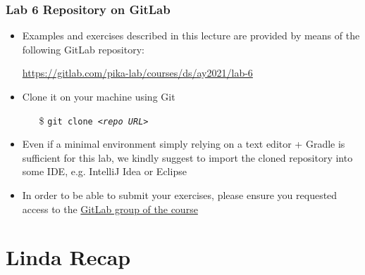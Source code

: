 \documentclass[presentation]{beamer}\mode<presentation>{\usetheme{AMSCesenaPurpleAndGold}}
\newcommand{\labN}{6}
\newcommand{\labGroup}{https://gitlab.com/pika-lab/courses/ds/ay2021}
\newcommand{\labRepo}{\labGroup/lab-\labN}
\begin{document}
\begin{frame}
	\frametitle{Lab \labN{} Repository on GitLab}

	\begin{itemize}
		\item Examples and exercises described in this lecture are provided by means of the following GitLab repository:
		\begin{center}
			\url{\labRepo}
		\end{center}

		\vfill

		\item Clone it on your machine using Git
		\begin{itemize}
		    \item[\$] \texttt{git clone \textit{<repo URL>}}
		\end{itemize}

		\vfill

		\item Even if a minimal environment simply relying on a text editor + Gradle is sufficient for this lab, we kindly suggest to import the cloned repository into some IDE, e.g. IntelliJ Idea or Eclipse

		\vfill

		\item In order to be able to submit your exercises, please ensure you requested access to the \href{\labGroup}{GitLab group of the course}
	\end{itemize}

\end{frame}

\section{Linda Recap}

\end{document}
